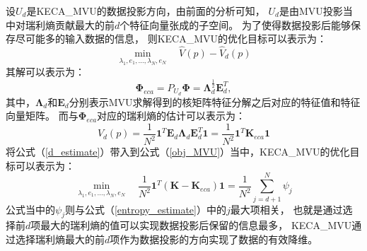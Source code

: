设$U_d$是KECA\_MVU的数据投影方向，由前面的分析可知，
$U_d$是由MVU投影当中对瑞利熵贡献最大的前$d$个特征向量张成的子空间。
为了使得数据投影后能够保存尽可能多的输入数据的信息，
则KECA\_MVU的优化目标可以表示为：
\begin{equation}
\label{obj_MVU}
\min \limits_{\lambda_1,e_1,\ldots,\lambda_N,e_N} \quad \hat{V}(p)-\hat{V}_{d}(p)
\end{equation}
其解可以表示为：
\begin{equation}
\label{projection}
\bm{\Phi}_{eca}=P_{U_d}\bm{\Phi}=\bm{\Lambda}_d^{\frac{1}{2}}\mathbf{E}_{d}^T,
\end{equation}
其中，$\bm{\Lambda}_d$和$\mathbf{E}_{d}$分别表示MVU求解得到的核矩阵特征分解之后对应的特征值和特征向量矩阵。
而与$\bm{\Phi}_{eca}$对应的瑞利熵的估计可以表示为：
\begin{equation}
\label{d_estimate}
V_d(p)=\frac{1}{N^2}\mathbf{1}^T\mathbf{E}_{d}\bm{\Lambda}_d\mathbf{E}_{d}^T\mathbf{1}
=\frac{1}{N^2}\mathbf{1}^T\mathbf{K}_{eca}\mathbf{1}
\end{equation}
将公式（\ref{d_estimate}）带入到公式（\ref{obj_MVU}）当中，KECA\_MVU的优化目标可以表示为：
\begin{equation}
\min \limits_{\lambda_1,e_1,\ldots,\lambda_N,e_N} \quad 
\frac{1}{N^2}\mathbf{1}^T(\mathbf{K}-\mathbf{K}_{eca})\mathbf{1}
=\frac{1}{N^2}\sum_{j=d+1}^{N}\psi_j
\end{equation}
公式当中的$\psi_j$则与公式（\ref{entropy_estimate}）中的$j$最大项相关，
也就是通过选择前$d$项最大的瑞利熵的值可以实现数据投影后保留的信息最多，
KECA\_MVU通过选择瑞利熵最大的前$d$项作为数据投影的方向实现了数据的有效降维。

